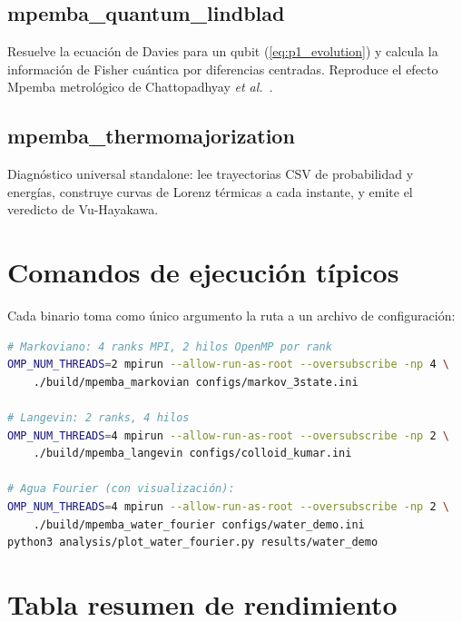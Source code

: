 \subsection{mpemba\_quantum\_lindblad}
Resuelve la ecuación de Davies para un qubit (\cref{eq:p1_evolution}) y calcula 
la información de Fisher cuántica por diferencias centradas. Reproduce el 
efecto Mpemba metrológico de Chattopadhyay \emph{et al.}~\cite{chattopadhyay2026}.

\subsection{mpemba\_thermomajorization}
Diagnóstico universal standalone: lee trayectorias CSV de probabilidad y 
energías, construye curvas de Lorenz térmicas a cada instante, y emite el 
veredicto de Vu-Hayakawa.

\section{Comandos de ejecución típicos}

Cada binario toma como único argumento la ruta a un archivo de configuración:

\begin{lstlisting}[language=bash, basicstyle=\ttfamily\footnotesize]
# Markoviano: 4 ranks MPI, 2 hilos OpenMP por rank
OMP_NUM_THREADS=2 mpirun --allow-run-as-root --oversubscribe -np 4 \
    ./build/mpemba_markovian configs/markov_3state.ini

# Langevin: 2 ranks, 4 hilos
OMP_NUM_THREADS=4 mpirun --allow-run-as-root --oversubscribe -np 2 \
    ./build/mpemba_langevin configs/colloid_kumar.ini

# Agua Fourier (con visualización):
OMP_NUM_THREADS=4 mpirun --allow-run-as-root --oversubscribe -np 2 \
    ./build/mpemba_water_fourier configs/water_demo.ini
python3 analysis/plot_water_fourier.py results/water_demo
\end{lstlisting}

\section{Tabla resumen de rendimiento}

